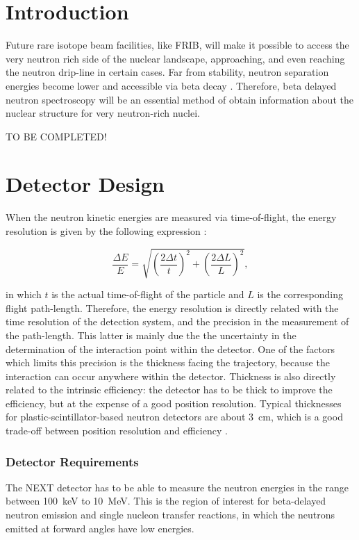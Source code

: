 \documentclass[preprint,3p,twocolumn]{elsarticle}
\begin{document}
\linenumbers

\section{Introduction}
Future rare isotope beam facilities, like FRIB, will make it possible to access the very neutron rich
side of the nuclear landscape, approaching, and even reaching the neutron drip-line in certain
cases. Far from stability, neutron separation energies become lower and accessible via beta decay \cite{FRIB}.
Therefore, beta delayed neutron spectroscopy will be an essential method of obtain information
about the nuclear structure for very neutron-rich nuclei.

\begin{center}
{ \color{red} TO BE COMPLETED!}
\end{center}
\section{ Detector Design}

When the neutron kinetic  energies are measured via time-of-flight, the energy resolution is given by the following expression \cite{KORNILOV2009226}:

\begin{equation}
\frac{\Delta E}{E}=\sqrt{\left(\frac{2\Delta t}{t}\right )^2+\left(\frac{2\Delta L}{L}\right )^2},
\label{eq:resolution}
\end{equation}

in which $t$  is the actual time-of-flight of the particle and $L$ is the corresponding flight path-length. Therefore, the energy resolution is directly related with the time resolution of the detection system, and the precision in the measurement of the path-length. This latter is mainly due the the uncertainty in the determination of the interaction point within the detector. One of the factors which limits this precision is the thickness facing the trajectory, because the interaction can occur anywhere within the detector.  Thickness is also directly related to the intrinsic efficiency: the detector has to be thick to improve the efficiency, but at the expense of a good position resolution. Typical thicknesses for plastic-scintillator-based neutron detectors are about 3~cm, which is a good trade-off between position resolution and efficiency \cite{PETERS2016122,BUTA2000412}.

\subsubsection{Detector Requirements}
The NEXT detector has to be able to measure the neutron energies in the range between 100~keV to 10~MeV. This is the region of interest for beta-delayed neutron emission and single nucleon transfer reactions, in which the neutrons emitted at forward angles have low energies\cite{}.  
\end{document}
